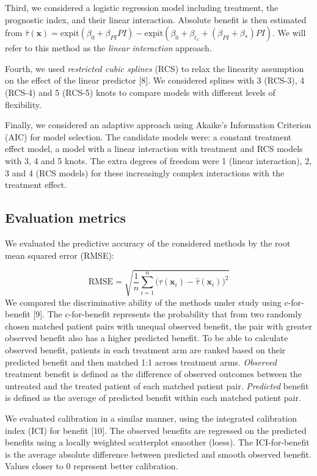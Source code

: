 \documentclass[]{elsarticle} %
\begin{document}
Third, we considered a logistic regression model including treatment,
the prognostic index, and their linear interaction. Absolute benefit is
then estimated from
\(\hat{\tau}(\bm{x})=\text{expit}(\beta_0+\beta_{PI}PI) - \text{expit}(\beta_0+\beta_{t_x}+(\beta_{PI}+\beta_*)PI)\).
We will refer to this method as the \emph{linear interaction} approach.

Fourth, we used \emph{restricted cubic splines} (RCS) to relax the
linearity assumption on the effect of the linear predictor {[}8{]}. We
considered splines with 3 (RCS-3), 4 (RCS-4) and 5 (RCS-5) knots to
compare models with different levels of flexibility.

Finally, we considered an adaptive approach using Akaike's Information
Criterion (AIC) for model selection. The candidate models were: a
constant treatment effect model, a model with a linear interaction with
treatment and RCS models with 3, 4 and 5 knots. The extra degrees of
freedom were 1 (linear interaction), 2, 3 and 4 (RCS models) for these
increasingly complex interactions with the treatment effect.

\hypertarget{evaluation-metrics}{%
\subsection{Evaluation metrics}\label{evaluation-metrics}}

We evaluated the predictive accuracy of the considered methods by the
root mean squared error (RMSE):

\[\text{RMSE}=\sqrt{\frac{1}{n}\sum_{i=1}^n\big(\tau(\bm{x}_i) - \hat{\tau}(\bm{x}_i)\big)^2}\]
We compared the discriminative ability of the methods under study using
c-for-benefit {[}9{]}. The c-for-benefit represents the probability that
from two randomly chosen matched patient pairs with unequal observed
benefit, the pair with greater observed benefit also has a higher
predicted benefit. To be able to calculate observed benefit, patients in
each treatment arm are ranked based on their predicted benefit and then
matched 1:1 across treatment arms. \emph{Observed} treatment benefit is
defined as the difference of observed outcomes between the untreated and
the treated patient of each matched patient pair. \emph{Predicted}
benefit is defined as the average of predicted benefit within each
matched patient pair.

We evaluated calibration in a similar manner, using the integrated
calibration index (ICI) for benefit {[}10{]}. The observed benefits are
regressed on the predicted benefits using a locally weighted scatterplot
smoother (loess). The ICI-for-benefit is the average absolute difference
between predicted and smooth observed benefit. Values closer to \(0\)
represent better calibration.
\end{document}
